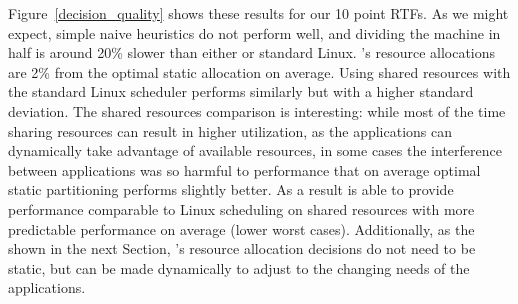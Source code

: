 Figure~\ref{decision_quality} shows these results for our 10 point RTFs. As we might expect, simple naive heuristics do not perform well, and dividing the machine in half is around 20\% slower than either \pacora or standard Linux.
 \pacora's resource allocations are 2\% from the optimal static allocation on average.  Using shared resources with the standard Linux scheduler performs similarly but with a higher standard deviation.  The shared resources comparison is interesting: while most of the time sharing resources can result in higher utilization, as the applications can dynamically take advantage of available resources, in some cases the interference between applications was so harmful to performance that on average optimal static partitioning performs slightly better.  As a result \pacora is able to provide performance comparable to Linux scheduling on shared resources with more predictable performance on average (lower worst cases).  Additionally, as the shown in the next Section, \pacora's resource allocation decisions do not need to be static, but can be made dynamically to adjust to the changing needs of the applications.


